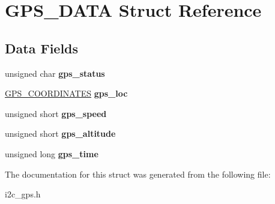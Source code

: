 \hypertarget{struct_g_p_s___d_a_t_a}{\section{G\-P\-S\-\_\-\-D\-A\-T\-A Struct Reference}
\label{struct_g_p_s___d_a_t_a}
}
\subsection*{Data Fields}
\begin{DoxyCompactItemize}
\item 
\hypertarget{struct_g_p_s___d_a_t_a_abf39dc1f5ca100c9a24f4a6846f9ecdf}{unsigned char {\bfseries gps\-\_\-status}}\label{struct_g_p_s___d_a_t_a_abf39dc1f5ca100c9a24f4a6846f9ecdf}

\item 
\hypertarget{struct_g_p_s___d_a_t_a_adb0f4d871dc534f3ea2b942bb075c840}{\hyperlink{struct_g_p_s___c_o_o_r_d_i_n_a_t_e_s}{G\-P\-S\-\_\-\-C\-O\-O\-R\-D\-I\-N\-A\-T\-E\-S} {\bfseries gps\-\_\-loc}}\label{struct_g_p_s___d_a_t_a_adb0f4d871dc534f3ea2b942bb075c840}

\item 
\hypertarget{struct_g_p_s___d_a_t_a_ab0e3d4ad326ab08774b4dfcf99923e6f}{unsigned short {\bfseries gps\-\_\-speed}}\label{struct_g_p_s___d_a_t_a_ab0e3d4ad326ab08774b4dfcf99923e6f}

\item 
\hypertarget{struct_g_p_s___d_a_t_a_a027fdd1cae1a68ff01d73eaf52aa2ff3}{unsigned short {\bfseries gps\-\_\-altitude}}\label{struct_g_p_s___d_a_t_a_a027fdd1cae1a68ff01d73eaf52aa2ff3}

\item 
\hypertarget{struct_g_p_s___d_a_t_a_af9427b6243fccae610da3a0fba22ef6d}{unsigned long {\bfseries gps\-\_\-time}}\label{struct_g_p_s___d_a_t_a_af9427b6243fccae610da3a0fba22ef6d}

\end{DoxyCompactItemize}


The documentation for this struct was generated from the following file\-:\begin{DoxyCompactItemize}
\item 
i2c\-\_\-gps.\-h\end{DoxyCompactItemize}
